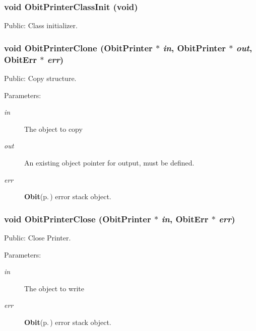 \subsubsection{\setlength{\rightskip}{0pt plus 5cm}void Obit\-Printer\-Class\-Init (void)}\label{ObitPrinter_8h_a9}


Public: Class initializer. 

\subsubsection{\setlength{\rightskip}{0pt plus 5cm}void Obit\-Printer\-Clone ({\bf Obit\-Printer} $\ast$ {\em in}, {\bf Obit\-Printer} $\ast$ {\em out}, {\bf Obit\-Err} $\ast$ {\em err})}\label{ObitPrinter_8h_a14}


Public: Copy structure. 

\begin{Desc}
\item[Parameters:]
\begin{description}
\item[{\em in}]The object to copy \item[{\em out}]An existing object pointer for output, must be defined. \item[{\em err}]{\bf Obit}{\rm (p.\,\pageref{structObit})} error stack object. \end{description}
\end{Desc}
\subsubsection{\setlength{\rightskip}{0pt plus 5cm}void Obit\-Printer\-Close ({\bf Obit\-Printer} $\ast$ {\em in}, {\bf Obit\-Err} $\ast$ {\em err})}\label{ObitPrinter_8h_a17}


Public: Close Printer. 

\begin{Desc}
\item[Parameters:]
\begin{description}
\item[{\em in}]The object to write \item[{\em err}]{\bf Obit}{\rm (p.\,\pageref{structObit})} error stack object. \end{description}
\end{Desc}
